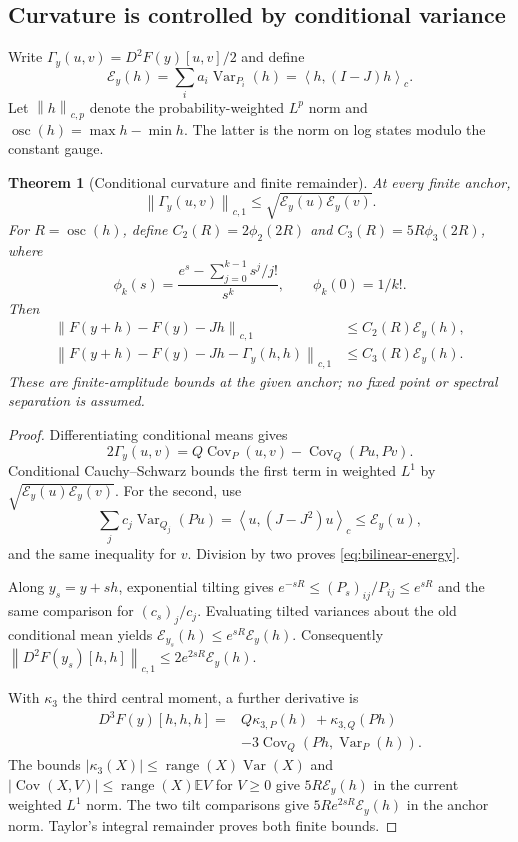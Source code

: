 \documentclass[journal]{IEEEtran}
\newtheorem{theorem}{Theorem}
\theoremstyle{definition}
\newcommand{\norm}[1]{\left\lVert#1\right\rVert}
\newcommand{\ip}[2]{\left\langle#1,#2\right\rangle}
\DeclareMathOperator{\osc}{osc}
\DeclareMathOperator{\Var}{Var}
\DeclareMathOperator{\Cov}{Cov}
\begin{document}
\subsection{Curvature is controlled by conditional variance}
Write $\Gamma_y(u,v)=D^2F(y)[u,v]/2$ and define
\begin{equation}
 \mathcal E_y(h)=\sum_i a_i\Var_{P_i}(h)
               =\ip{h}{(I-J)h}_c.\label{eq:energy}
\end{equation}
Let $\norm{h}_{c,p}$ denote the probability-weighted $L^p$ norm and
$\osc(h)=\max h-\min h$. The latter is the norm on log states modulo
the constant gauge.

\begin{theorem}[Conditional curvature and finite remainder]\label{thm:energy}
At every finite anchor,
\begin{equation}
 \norm{\Gamma_y(u,v)}_{c,1}
 \leq\sqrt{\mathcal E_y(u)\mathcal E_y(v)}.\label{eq:bilinear-energy}
\end{equation}
For $R=\osc(h)$, define $C_2(R)=2\phi_2(2R)$ and
$C_3(R)=5R\phi_3(2R)$, where
\[
 \phi_k(s)=\frac{e^s-\sum_{j=0}^{k-1}s^j/j!}{s^k},
 \qquad \phi_k(0)=1/k!.
\]
Then
\begin{align}
 \norm{F(y+h)-F(y)-Jh}_{c,1}
 &\leq C_2(R)\mathcal E_y(h),\label{eq:linear-energy}\\
 \norm{F(y+h)-F(y)-Jh-\Gamma_y(h,h)}_{c,1}
 &\leq C_3(R)\mathcal E_y(h).\label{eq:cubic-energy}
\end{align}
These are finite-amplitude bounds at the given anchor; no fixed point
or spectral separation is assumed.
\end{theorem}
\begin{proof}
Differentiating conditional means gives
\[
 2\Gamma_y(u,v)=Q\Cov_P(u,v)-\Cov_Q(Pu,Pv).
\]
Conditional Cauchy--Schwarz bounds the first term in weighted $L^1$ by
$\sqrt{\mathcal E_y(u)\mathcal E_y(v)}$. For the second, use
\[
 \sum_jc_j\Var_{Q_j}(Pu)=\ip{u}{(J-J^2)u}_c
 \leq\mathcal E_y(u),
\]
and the same inequality for $v$. Division by two proves
\eqref{eq:bilinear-energy}.

Along $y_s=y+sh$, exponential tilting gives
$e^{-sR}\leq(P_s)_{ij}/P_{ij}\leq e^{sR}$ and the same comparison for
$(c_s)_j/c_j$. Evaluating tilted variances about the old conditional mean
yields $\mathcal E_{y_s}(h)\leq e^{sR}\mathcal E_y(h)$.
Consequently $\norm{D^2F(y_s)[h,h]}_{c,1}
\leq2e^{2sR}\mathcal E_y(h)$.

With $\kappa_3$ the third central moment, a further derivative is
\begin{align*}
 D^3F(y)[h,h,h]={}&Q\kappa_{3,P}(h)\;+
                  \kappa_{3,Q}(Ph)\\
                &-3\Cov_Q(Ph,\Var_P(h)).
\end{align*}
The bounds $|\kappa_3(X)|\leq\operatorname{range}(X)\Var(X)$ and
$|\Cov(X,V)|\leq\operatorname{range}(X)\mathbb E V$ for $V\geq0$
give $5R\mathcal E_y(h)$ in the current weighted $L^1$ norm.
The two tilt comparisons give $5Re^{2sR}\mathcal E_y(h)$ in the anchor
norm. Taylor's integral remainder proves both finite bounds.
\end{proof}
\end{document}
